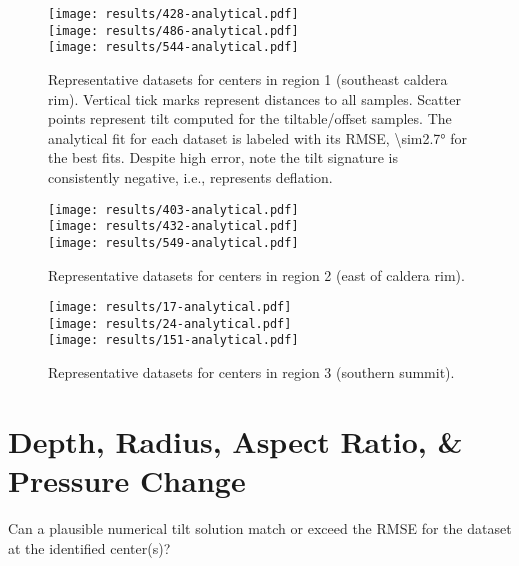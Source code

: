 \begin{figure}
    \vspace{-15pt}
    \texttt{[image: results/428-analytical.pdf]}\\
    \texttt{[image: results/486-analytical.pdf]}\\
    \texttt{[image: results/544-analytical.pdf]}%
    \caption[Southeast Caldera Rim: analytical fit]{Representative datasets for centers in region 1 (southeast caldera rim). Vertical tick marks represent distances to all samples. Scatter points represent tilt computed for the tiltable/offset samples. The analytical fit for each dataset is labeled with its \acs{RMSE}, \ang{\sim2.7} for the best fits. Despite high error, note the tilt signature is consistently negative, i.e., represents deflation.}
    \label{fig:region1-analytical}
\end{figure}

\begin{figure}
    \vspace{-15pt}
    \texttt{[image: results/403-analytical.pdf]}\\
    \texttt{[image: results/432-analytical.pdf]}\\
    \texttt{[image: results/549-analytical.pdf]}%
    \caption[East of Caldera Rim: analytical fit]{Representative datasets for centers in region 2 (east of caldera rim).}
    \label{fig:region2-analytical}
\end{figure}

\begin{figure}
    \texttt{[image: results/17-analytical.pdf]}\\
    \texttt{[image: results/24-analytical.pdf]}\\
    \texttt{[image: results/151-analytical.pdf]}%
    \caption[East of Caldera Rim: analytical fit]{Representative datasets for centers in region 3 (southern summit).}
    \label{fig:region34-analytical}
\end{figure}

\section{Depth, Radius, Aspect Ratio, \& Pressure Change}

Can a plausible numerical tilt solution match or exceed the \acs{RMSE} for the dataset at the identified center(s)?
